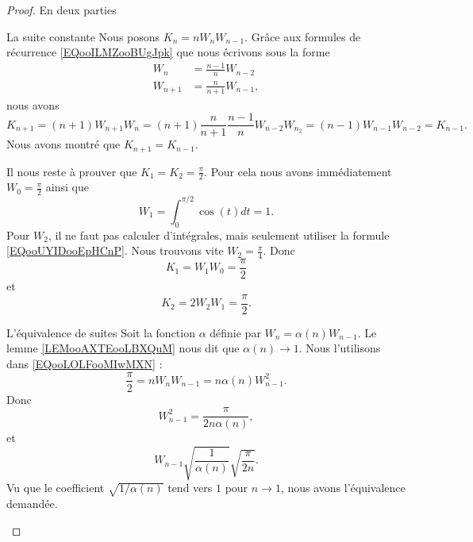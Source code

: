 \begin{proof}
    En deux parties
    \begin{subproof}
        \item[La suite constante]
            Nous posons \( K_n=nW_nW_{n-1}\). Grâce aux formules de récurrence \eqref{EQooILMZooBUgJpk} que nous écrivons sous la forme
            \begin{subequations}
                \begin{align}
                    W_n&=\frac{ n-1 }{ n }W_{n-2}\\
                    W_{n+1}&=\frac{ n }{ n+1 }W_{n-1},
                \end{align}
            \end{subequations}
            nous avons
            \begin{equation}
                K_{n+1}=(n+1)W_{n+1}W_n=(n+1)\frac{ n }{ n+1 }\frac{ n-1 }{ n }W_{n-2}W_{n_2}=(n-1)W_{n-1}W_{n-2}=K_{n-1}.
            \end{equation}
            Nous avons montré que \( K_{n+1}=K_{n-1}\).

            Il nous reste à prouver que \( K_1=K_2=\frac{ \pi }{2}\). Pour cela nous avons immédiatement \( W_0=\frac{ \pi }{2}\) ainsi que
            \begin{equation}
                W_1=\int_0^{\pi/2}\cos(t)dt=1.
            \end{equation}
            Pour \( W_2\), il ne faut pas calculer d'intégrales, mais seulement utiliser la formule \eqref{EQooUYIDooEpHCnP}. Nous trouvons vite \( W_2=\frac{ \pi }{ 4 }\). Donc
            \begin{equation}
                K_1=W_1W_0=\frac{ \pi }{2}
            \end{equation}
            et
            \begin{equation}
                K_2=2W_2W_1=\frac{ \pi }{2}.
            \end{equation}
        \item[L'équivalence de suites]
            Soit la fonction \( \alpha\)  définie par \( W_n=\alpha(n)W_{n-1}\). Le lemme \ref{LEMooAXTEooLBXQuM} nous dit que \( \alpha(n)\to 1\). Nous l'utilisons dans \eqref{EQooLOLFooMIwMXN} :
            \begin{equation}
                \frac{ \pi }{2}=nW_nW_{n-1}=n\alpha(n)W_{n-1}^2.
            \end{equation}
            Donc
            \begin{equation}
                W_{n-1}^2=\frac{ \pi }{ 2n\alpha(n) },
            \end{equation}
            et
            \begin{equation}
                W_{n-1}\sqrt{ \frac{1}{ \alpha(n) } }\sqrt{ \frac{ \pi }{ 2n } }.
            \end{equation}
            Vu que le coefficient \( \sqrt{ 1/\alpha(n) }\) tend vers \( 1\) pour \( n\to 1\), nous avons l'équivalence demandée.
    \end{subproof}
\end{proof}

